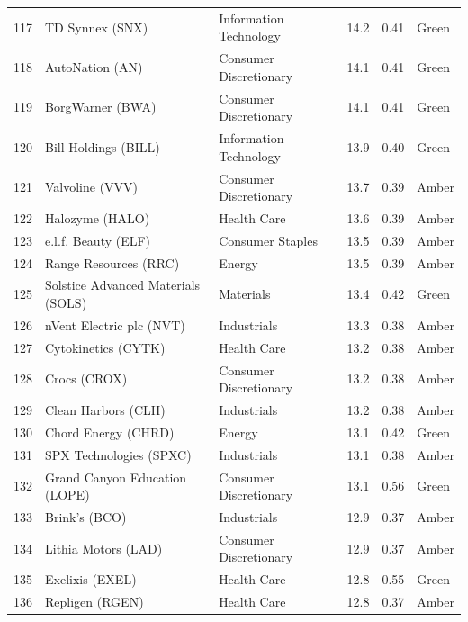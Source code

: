 \documentclass[11pt,a4paper]{article}
\begin{document}
{\begin{longtable}{r p{4.6cm} p{3cm} r r l}
117 & TD Synnex (SNX) & Information Technology & 14.2 & 0.41 & \cellcolor[HTML]{C6EFCE}Green \\
118 & AutoNation (AN) & Consumer Discretionary & 14.1 & 0.41 & \cellcolor[HTML]{C6EFCE}Green \\
119 & BorgWarner (BWA) & Consumer Discretionary & 14.1 & 0.41 & \cellcolor[HTML]{C6EFCE}Green \\
120 & Bill Holdings (BILL) & Information Technology & 13.9 & 0.40 & \cellcolor[HTML]{C6EFCE}Green \\
121 & Valvoline (VVV) & Consumer Discretionary & 13.7 & 0.39 & \cellcolor[HTML]{FFEB9C}Amber \\
122 & Halozyme (HALO) & Health Care & 13.6 & 0.39 & \cellcolor[HTML]{FFEB9C}Amber \\
123 & e.l.f. Beauty (ELF) & Consumer Staples & 13.5 & 0.39 & \cellcolor[HTML]{FFEB9C}Amber \\
124 & Range Resources (RRC) & Energy & 13.5 & 0.39 & \cellcolor[HTML]{FFEB9C}Amber \\
125 & Solstice Advanced Materials (SOLS) & Materials & 13.4 & 0.42 & \cellcolor[HTML]{C6EFCE}Green \\
126 & nVent Electric plc (NVT) & Industrials & 13.3 & 0.38 & \cellcolor[HTML]{FFEB9C}Amber \\
127 & Cytokinetics (CYTK) & Health Care & 13.2 & 0.38 & \cellcolor[HTML]{FFEB9C}Amber \\
128 & Crocs (CROX) & Consumer Discretionary & 13.2 & 0.38 & \cellcolor[HTML]{FFEB9C}Amber \\
129 & Clean Harbors (CLH) & Industrials & 13.2 & 0.38 & \cellcolor[HTML]{FFEB9C}Amber \\
130 & Chord Energy (CHRD) & Energy & 13.1 & 0.42 & \cellcolor[HTML]{C6EFCE}Green \\
131 & SPX Technologies (SPXC) & Industrials & 13.1 & 0.38 & \cellcolor[HTML]{FFEB9C}Amber \\
132 & Grand Canyon Education (LOPE) & Consumer Discretionary & 13.1 & 0.56 & \cellcolor[HTML]{C6EFCE}Green \\
133 & Brink's (BCO) & Industrials & 12.9 & 0.37 & \cellcolor[HTML]{FFEB9C}Amber \\
134 & Lithia Motors (LAD) & Consumer Discretionary & 12.9 & 0.37 & \cellcolor[HTML]{FFEB9C}Amber \\
135 & Exelixis (EXEL) & Health Care & 12.8 & 0.55 & \cellcolor[HTML]{C6EFCE}Green \\
136 & Repligen (RGEN) & Health Care & 12.8 & 0.37 & \cellcolor[HTML]{FFEB9C}Amber \\

\end{longtable}}
\end{document}
